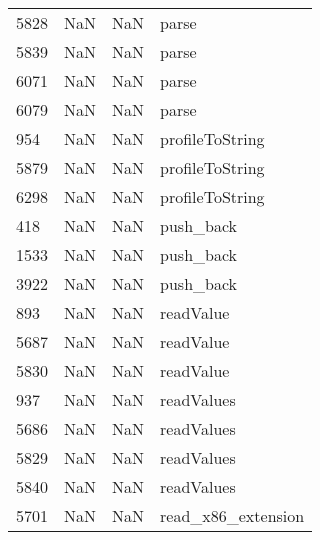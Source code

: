 \begin{tabular}{llll}
5828 &                   NaN &                        NaN &                                     parse \\
5839 &                   NaN &                        NaN &                                     parse \\
6071 &                   NaN &                        NaN &                                     parse \\
6079 &                   NaN &                        NaN &                                     parse \\
954  &                   NaN &                        NaN &                           profileToString \\
5879 &                   NaN &                        NaN &                           profileToString \\
6298 &                   NaN &                        NaN &                           profileToString \\
418  &                   NaN &                        NaN &                                 push\_back \\
1533 &                   NaN &                        NaN &                                 push\_back \\
3922 &                   NaN &                        NaN &                                 push\_back \\
893  &                   NaN &                        NaN &                                 readValue \\
5687 &                   NaN &                        NaN &                                 readValue \\
5830 &                   NaN &                        NaN &                                 readValue \\
937  &                   NaN &                        NaN &                                readValues \\
5686 &                   NaN &                        NaN &                                readValues \\
5829 &                   NaN &                        NaN &                                readValues \\
5840 &                   NaN &                        NaN &                                readValues \\
5701 &                   NaN &                        NaN &                        read\_x86\_extension \\

\end{tabular}

